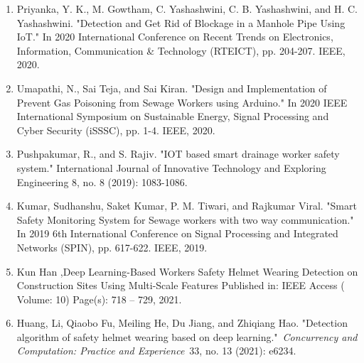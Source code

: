 \documentclass[12pt,a4paper]{report}
\begin{document}
\begin{enumerate}
\item  Priyanka, Y. K., M. Gowtham, C. Yashashwini, C. B. Yashashwini, and H. C. Yashashwini. "Detection and Get Rid of Blockage in a Manhole Pipe Using IoT." In 2020 International Conference on Recent Trends on Electronics, Information, Communication \& Technology (RTEICT), pp. 204-207. IEEE, 2020.

\item  Umapathi, N., Sai Teja, and Sai Kiran. "Design and Implementation of Prevent Gas Poisoning from Sewage Workers using Arduino." In 2020 IEEE International Symposium on Sustainable Energy, Signal Processing and Cyber Security (iSSSC), pp. 1-4. IEEE, 2020.

\item  Pushpakumar, R., and S. Rajiv. "IOT based smart drainage worker safety system." International Journal of Innovative Technology and Exploring Engineering 8, no. 8 (2019): 1083-1086.

\item  Kumar, Sudhanshu, Saket Kumar, P. M. Tiwari, and Rajkumar Viral. "Smart Safety Monitoring System for Sewage workers with two way communication." In 2019 6th International Conference on Signal Processing and Integrated Networks (SPIN), pp. 617-622. IEEE, 2019.

\item  Kun Han ,Deep Learning-Based Workers Safety Helmet Wearing Detection on Construction Sites Using Multi-Scale Features Published in: IEEE Access ( Volume: 10) Page(s): 718 -- 729, 2021.

\item  Huang, Li, Qiaobo Fu, Meiling He, Du Jiang, and Zhiqiang Hao. "Detection algorithm of safety helmet wearing based on deep learning."~\textit{Concurrency and Computation: Practice and Experience}~33, no. 13 (2021): e6234.
\end{enumerate}

\noindent 

\noindent 

\noindent 
\newpage
\end{document}
